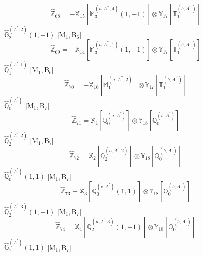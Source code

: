 \documentclass[fleqn,10pt,landscape]{article}
\begin{document}
\begin{itemize}
\begin{dmath*}
\hat{\mathbb{Z}}_{68}=- \mathbb{X}_{15}[\mathbb{M}_{3}^{(a,A^{\prime\prime},4)}(1,-1)] \otimes\mathbb{Y}_{17}[\mathbb{T}_{1}^{(b,A^{\prime\prime})}]
\end{dmath*}
\vspace{4mm}
\noindent {} $\,\,\,\hat{\mathbb{G}}_{2}^{(A^{\prime},2)}(1,-1)$ [M$_{1}$,\,B$_{6}$]
\begin{dmath*}
\hat{\mathbb{Z}}_{69}=- \mathbb{X}_{14}[\mathbb{M}_{3}^{(a,A^{\prime\prime},1)}(1,-1)] \otimes\mathbb{Y}_{17}[\mathbb{T}_{1}^{(b,A^{\prime\prime})}]
\end{dmath*}
\vspace{4mm}
\noindent {} $\,\,\,\hat{\mathbb{Q}}_{1}^{(A^{\prime},1)}$ [M$_{1}$,\,B$_{6}$]
\begin{dmath*}
\hat{\mathbb{Z}}_{70}=- \mathbb{X}_{16}[\mathbb{M}_{1}^{(a,A^{\prime\prime},2)}] \otimes\mathbb{Y}_{17}[\mathbb{T}_{1}^{(b,A^{\prime\prime})}]
\end{dmath*}
\vspace{4mm}
\noindent {} $\,\,\,\hat{\mathbb{Q}}_{0}^{(A^{\prime})}$ [M$_{1}$,\,B$_{7}$]
\begin{dmath*}
\hat{\mathbb{Z}}_{71}=\mathbb{X}_{1}[\mathbb{Q}_{0}^{(a,A^{\prime})}] \otimes\mathbb{Y}_{18}[\mathbb{Q}_{0}^{(b,A^{\prime})}]
\end{dmath*}
\vspace{4mm}
\noindent {} $\,\,\,\hat{\mathbb{Q}}_{2}^{(A^{\prime},2)}$ [M$_{1}$,\,B$_{7}$]
\begin{dmath*}
\hat{\mathbb{Z}}_{72}=\mathbb{X}_{2}[\mathbb{Q}_{2}^{(a,A^{\prime},2)}] \otimes\mathbb{Y}_{18}[\mathbb{Q}_{0}^{(b,A^{\prime})}]
\end{dmath*}
\vspace{4mm}
\noindent {} $\,\,\,\hat{\mathbb{Q}}_{0}^{(A^{\prime})}(1,1)$ [M$_{1}$,\,B$_{7}$]
\begin{dmath*}
\hat{\mathbb{Z}}_{73}=\mathbb{X}_{3}[\mathbb{Q}_{0}^{(a,A^{\prime})}(1,1)] \otimes\mathbb{Y}_{18}[\mathbb{Q}_{0}^{(b,A^{\prime})}]
\end{dmath*}
\vspace{4mm}
\noindent {} $\,\,\,\hat{\mathbb{Q}}_{2}^{(A^{\prime},3)}(1,-1)$ [M$_{1}$,\,B$_{7}$]
\begin{dmath*}
\hat{\mathbb{Z}}_{74}=\mathbb{X}_{4}[\mathbb{Q}_{2}^{(a,A^{\prime},3)}(1,-1)] \otimes\mathbb{Y}_{18}[\mathbb{Q}_{0}^{(b,A^{\prime})}]
\end{dmath*}
\vspace{4mm}
\noindent {} $\,\,\,\hat{\mathbb{G}}_{1}^{(A^{\prime})}(1,1)$ [M$_{1}$,\,B$_{7}$]

\end{itemize}
\end{document}
